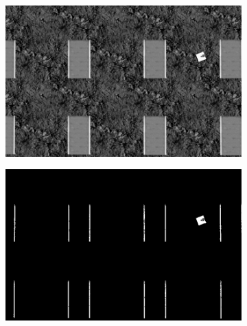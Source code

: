\begin{figure}[!htbp]
  \centering
   \begin{subfigure}[b]{0.45\textwidth}
        \includegraphics[width=\textwidth]{img/18730previousImage.png}\label{fig:original}
        \caption{}
   \end{subfigure}  \hfill
   \begin{subfigure}[b]{0.45\textwidth}
        \includegraphics[width=\textwidth]{img/18730_thresholded.png}\label{fig:threshold}
        \caption{}
   \end{subfigure}
   

\end{figure}
